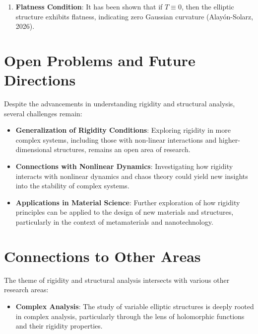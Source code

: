 \documentclass[11pt,a4paper]{article}
\begin{document}
\begin{enumerate}
\item \textbf{Flatness Condition}: It has been shown that if \( T \equiv 0 \), then the elliptic structure exhibits flatness, indicating zero Gaussian curvature (Alayón-Solarz, 2026).
\end{enumerate}

\section{Open Problems and Future Directions}

Despite the advancements in understanding rigidity and structural analysis, several challenges remain:

\begin{itemize}
\item \textbf{Generalization of Rigidity Conditions}: Exploring rigidity in more complex systems, including those with non-linear interactions and higher-dimensional structures, remains an open area of research.
\end{itemize}

\begin{itemize}
\item \textbf{Connections with Nonlinear Dynamics}: Investigating how rigidity interacts with nonlinear dynamics and chaos theory could yield new insights into the stability of complex systems.
\end{itemize}

\begin{itemize}
\item \textbf{Applications in Material Science}: Further exploration of how rigidity principles can be applied to the design of new materials and structures, particularly in the context of metamaterials and nanotechnology.
\end{itemize}

\section{Connections to Other Areas}

The theme of rigidity and structural analysis intersects with various other research areas:

\begin{itemize}
\item \textbf{Complex Analysis}: The study of variable elliptic structures is deeply rooted in complex analysis, particularly through the lens of holomorphic functions and their rigidity properties.
\end{itemize}
\end{document}
